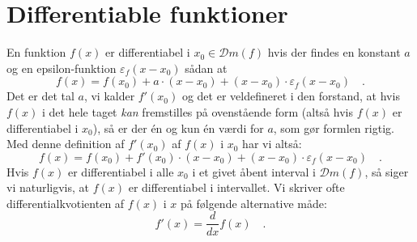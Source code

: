 \section{Differentiable funktioner} \label{tn14.secDifferentiation}
\begin{definition}[Differentiabilitet]
En funktion $f(x)$ er differentiabel i $x_{0} \in \mathcal{D}m(f)$ hvis der findes en konstant $a$ og en epsilon-funktion $\varepsilon_{f}(x-x_{0})$ sådan at
\begin{equation} \label{tn14.eqDifferentiabilitet}
f(x) = f(x_{0}) + a\cdot(x-x_{0}) + (x-x_{0})\cdot \varepsilon_{f}(x-x_{0}) \quad.
\end{equation}
Det er det tal $a$, vi kalder $f'(x_{0})$ og det er veldefineret i den forstand, at hvis $f(x)$ i det hele taget \emph{kan} fremstilles på ovenstående form
(altså hvis $f(x)$ er differentiabel i $x_{0}$), så er der \'{e}n og kun \'{e}n værdi for $a$, som gør formlen rigtig. Med denne definition af  $f'(x_{0})$ af $f(x)$ i $x_{0}$ har vi altså:
\begin{equation} \label{tn14.eqDifferentiabilitetB}
f(x) = f(x_{0}) + f'(x_{0})\cdot(x-x_{0}) + (x-x_{0})\cdot \varepsilon_{f}(x-x_{0}) \quad.
\end{equation}
Hvis $f(x)$ er differentiabel i alle $x_{0}$ i et givet åbent interval i $\mathcal{D}m(f)$, så siger vi naturligvis, at $f(x)$ er differentiabel i intervallet.
Vi skriver ofte differentialkvotienten af $f(x)$ i $x$ på følgende alternative måde:
\begin{equation}
f'(x) = \frac{d}{dx}f(x) \quad .
\end{equation}
\end{definition}

